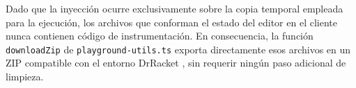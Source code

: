 Dado que la inyección ocurre exclusivamente sobre la copia temporal empleada para la ejecución, los archivos que conforman el estado del editor en el cliente nunca contienen código de instrumentación. En consecuencia, la función \texttt{download\allowbreak Zip} de \texttt{playground-utils.ts} exporta directamente esos archivos en un ZIP compatible con el entorno DrRacket \cite{felleisen2018racket}, sin requerir ningún paso adicional de limpieza.
